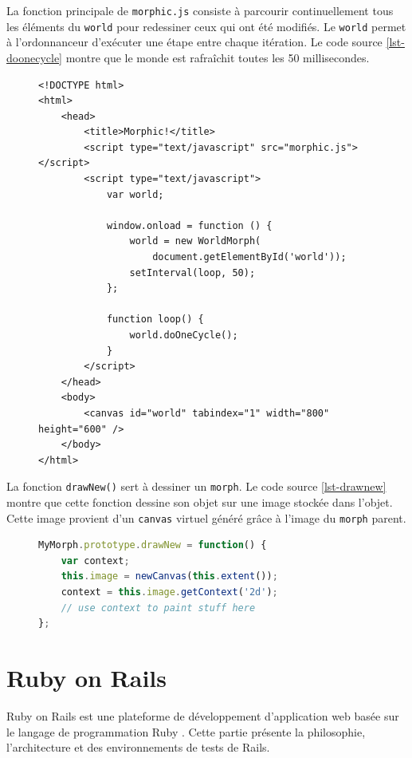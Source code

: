 La fonction principale de \texttt{morphic.js} consiste à parcourir continuellement tous les éléments du \texttt{world} pour redessiner ceux qui ont été modifiés. Le \texttt{world} permet à l'ordonnanceur d'exécuter une étape entre chaque itération. Le code source \ref{lst-doonecycle} montre que le monde est rafraîchit toutes les 50 millisecondes.
\begin{figure}
\begin{lstlisting}[caption={Exemple d'utilisation de \texttt{morphic.js}},label=lst-doonecycle,language=HTML5,alsolanguage=JavaScript]
<!DOCTYPE html>
<html>
    <head>
        <title>Morphic!</title>
        <script type="text/javascript" src="morphic.js"></script>
        <script type="text/javascript">
            var world;

            window.onload = function () {
                world = new WorldMorph(
                    document.getElementById('world'));
                setInterval(loop, 50);
            };

            function loop() {
                world.doOneCycle();
            }
        </script>
    </head>
    <body>
        <canvas id="world" tabindex="1" width="800" height="600" />
    </body>
</html>
\end{lstlisting}
\end{figure}
La fonction \texttt{drawNew()} sert à dessiner un \texttt{morph}. Le code source \ref{lst-drawnew} montre que cette fonction dessine son objet sur une image stockée dans l'objet. Cette image provient d'un \texttt{canvas} virtuel généré grâce à l'image du \texttt{morph} parent.

\begin{figure}
\begin{lstlisting}[caption={Modèle pour la fonction \texttt{drawNew()}},label=lst-drawnew,language=JavaScript]
MyMorph.prototype.drawNew = function() {
    var context;
    this.image = newCanvas(this.extent());
    context = this.image.getContext('2d');
    // use context to paint stuff here
};
\end{lstlisting}
\end{figure}

\section{Ruby on Rails}
\label{rails} 
Ruby on Rails \cite{rails} est une plateforme de développement d'application web basée sur le langage de programmation Ruby \cite{ruby}. Cette partie présente la philosophie, l'architecture et des environnements de tests de Rails.


